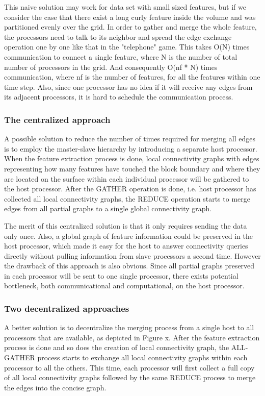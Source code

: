 \documentclass[10pt, conference, compsocconf]{IEEEtran}
\begin{document}
This naive solution may work for data set with small sized features, but if we consider the case that there exist a long curly feature inside the volume and was partitioned evenly over the grid. In order to gather and merge the whole feature, the processors need to talk to its neighbor and spread the edge exchange operation one by one like that in the "telephone" game. This takes O(N) times communication to connect a single feature, where N is the number of total number of processors in the grid. And consequently O(nf * N) times communication, where nf is the number of features, for all the features within one time step. Also, since one processor has no idea if it will receive any edges from its adjacent processors, it is hard to schedule the communication process.

\subsubsection{The centralized approach}
A possible solution to reduce the number of times required for merging all edges is to employ the master-slave hierarchy by introducing a separate host processor. When the feature extraction process is done, local connectivity graphs with edges representing how many features have touched the block boundary and where they are located on the surface within each individual processor will be gathered to the host processor. After the GATHER operation is done, i.e. host processor has collected all local connectivity graphs, the REDUCE operation starts to merge edges from all partial graphs to a single global connectivity graph.

The merit of this centralized solution is that it only requires sending the data only once. Also, a global graph of feature information could be preserved in the host processor, which made it easy for the host to answer connectivity queries directly without pulling information from slave processors a second time. However the drawback of this approach is also obvious. Since all partial graphs preserved in each processor will be sent to one single processor, there exists potential bottleneck, both communicational and computational, on the host processor.

\subsubsection{Two decentralized approaches}
A better solution is to decentralize the merging process from a single host to all processors that are available, as depicted in Figure x. After the feature extraction process is done and so does the creation of local connectivity graph, the ALL-GATHER process starts to exchange all local connectivity graphs within each processor to all the others. This time, each processor will first collect a full copy of all local connectivity graphs followed by the same REDUCE process to merge the edges into the concise graph. 
\end{document}
